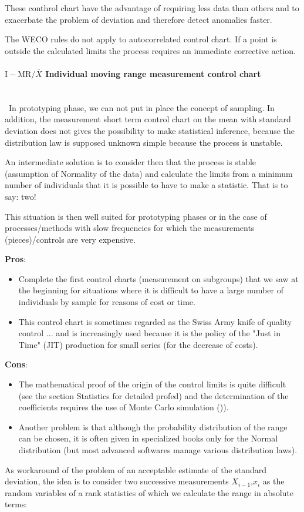 	These conthrol chart have the advantage of requiring less data than others and to exacerbate the problem of deviation and therefore detect anomalies faster.

	The WECO rules do not apply to autocorrelated control chart. If a point is outside the calculated limits the process requires an immediate corrective action.
	
	\paragraph{$\text{I}-\text{MR}/\overline{X}$ Individual moving range measurement control chart}\mbox{}\\\
	In prototyping phase, we can not put in place the concept of sampling. In addition, the measurement short term control chart on the mean with standard deviation  does not gives the possibility to make statistical inference, because the distribution law is supposed unknown simple because the process is unstable.

	An intermediate solution is to consider then that the process is stable (assumption of Normality of the data) and calculate the limits from a minimum number of individuals that it is possible to have to make a statistic. That is to say: two!

	This situation is then well suited for prototyping phases or in the case of processes/methods with slow frequencies for which the measurements (pieces)/controls are very expensive.
	
	\textbf{Pros}:
	\begin{itemize}
		\item Complete the first control charts (measurement on subgroups) that we saw at the beginning for situations where it is difficult to have a large number of individuals by sample for reasons of cost or time.

		\item This control chart is sometimes regarded as the Swiss Army knife of quality control ... and is increasingly used because it is the policy of the "Just in Time" (JIT) production for  small series (for the decrease of costs).
	\end{itemize}

	\textbf{Cons}:
	\begin{itemize}
		\item The mathematical proof of the origin of the control limits is quite difficult (see the section Statistics for detailed profed) and the determination of the coefficients requires the use of  Monte Carlo simulation ()). 

		\item Another problem is that although the probability distribution of the range can be chosen, it is often given in specialized books only for the Normal distribution (but most advanced softwares manage various distribution laws).
 	\end{itemize}
 	As workaround of the problem of an acceptable estimate of the standard deviation, the idea is to consider two successive measurements $X_{i-1}$,$x_i$ as the random variables of a rank statistics of which we calculate the range in absolute terms:
	
